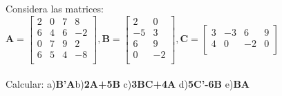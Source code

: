 \documentclass[12pt]{article}
\newenvironment{problem}[2][Problema]{\begin{trivlist}
\item[\hskip \labelsep {\bfseries #1}\hskip \labelsep {\bfseries #2.}]}{\end{trivlist}}
\begin{document}




\begin{problem}{I} 
Considera las matrices: $\textbf{A}=
\begin{bmatrix}
2 & 0 & 7 & 8\\
6 & 4 & 6 & -2 \\
0 & 7 & 9 & 2 \\
6 & 5 & 4 & -8\\
\end{bmatrix},
\textbf{B}= 
\begin{bmatrix}
2 & 0 \\
-5 & 3 \\
6 & 9 \\
0 & -2 \\
\end{bmatrix},
\textbf{C}=
\begin{bmatrix}
3 & -3 & 6 & 9 \\
4 & 0 & -2 & 0 \\
\end{bmatrix}$
\\ \\
Calcular: a)\textbf{B'A}\:b)\textbf{2A+5B} \: c)\textbf{3BC+4A} \: d)\textbf{5C'-6B} \: e)\textbf{BA}
\end{problem}
\end{document}

